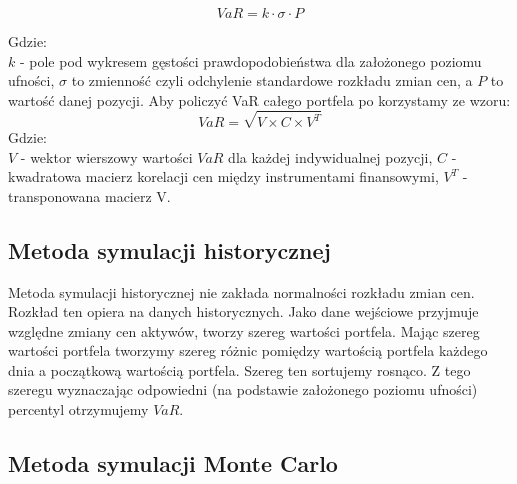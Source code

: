\documentclass[11pt,titlepage]{article}
\numberwithin{equation}{section}
\begin{document}
$$ VaR = k \cdot \sigma \cdot P $$

\noindent Gdzie:\\
\noindent $ k $ - pole pod wykresem gęstości prawdopodobieństwa dla założonego poziomu ufności, 
$ \sigma $ to zmienność czyli odchylenie standardowe rozkładu zmian cen, a $ P $ to wartość danej pozycji.
Aby policzyć VaR całego portfela po korzystamy ze wzoru:
$$ VaR=\sqrt{V \times C \times V^{T}} $$
\noindent Gdzie:\\
\noindent $ V $ - wektor wierszowy wartości $VaR$ dla każdej indywidualnej pozycji, $ C $ - kwadratowa macierz korelacji cen między instrumentami finansowymi, $ V^{T} $ - transponowana macierz V.\\

\subsection{Metoda symulacji historycznej}
Metoda symulacji historycznej nie zakłada normalności rozkładu zmian cen. Rozkład ten opiera na danych historycznych. Jako dane wejściowe przyjmuje względne zmiany cen aktywów, tworzy szereg wartości portfela. Mając szereg wartości portfela tworzymy szereg różnic pomiędzy wartością portfela każdego dnia a początkową wartością portfela. Szereg ten sortujemy rosnąco. Z tego szeregu wyznaczając odpowiedni (na podstawie założonego poziomu ufności) percentyl otrzymujemy $VaR$.\\








\newpage

\subsection{Metoda symulacji Monte Carlo}
\end{document}
